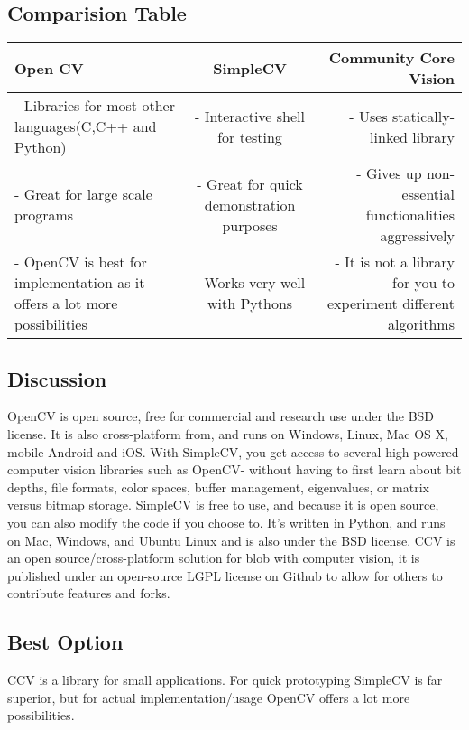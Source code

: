 \subsection{Comparision Table}
\begin{center}
  \begin{tabular}{| l | c | r |}
    \hline
    Open CV & SimpleCV & Community Core Vision \\ \hline
    \parbox{5cm}{- Libraries for most other languages(C,C++ and Python)} & \parbox{5cm}{- Interactive shell for testing} & \parbox{5cm}{- Uses statically-linked library} \\
    \parbox{5cm}{- Great for large scale programs} & \parbox{5cm}{- Great for quick demonstration purposes} & \parbox{5cm}{- Gives up non-essential functionalities aggressively} \\
    \parbox{5cm}{- OpenCV is best for implementation as it offers a lot more possibilities} & \parbox{5cm}{- Works very well with Pythons} & \parbox{5cm}{- It is not a library for you to experiment different algorithms} \\
    \hline
  \end{tabular}
\end{center}

\subsection{Discussion}
OpenCV is open source, free for commercial and research use under the BSD license.
It is also cross-platform from, and runs on Windows, Linux, Mac OS X, mobile Android and iOS. With SimpleCV, you get access to several high-powered computer vision libraries such as OpenCV- without having to first learn about bit depths, file formats, color spaces, buffer management, eigenvalues, or matrix versus bitmap storage.
SimpleCV is free to use, and because it is open source, you can also modify the code if you choose to.
It’s written in Python, and runs on Mac, Windows, and Ubuntu Linux and is also under the BSD license.
CCV is an open source/cross-platform solution for blob with computer vision,
it is published under an open-source LGPL license on Github to allow for others to contribute features and forks.


\subsection{Best Option}
CCV is a library for small applications.
For quick prototyping SimpleCV is far superior, but for actual implementation/usage OpenCV offers a lot more possibilities.

